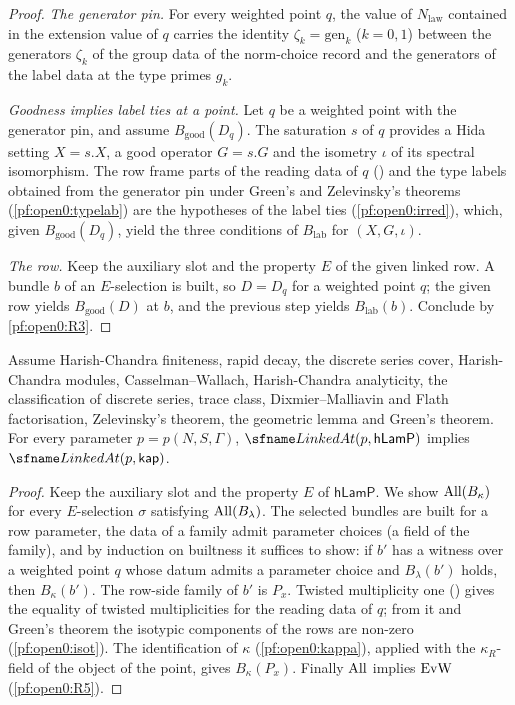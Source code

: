 \begin{proof}
\emph{The generator pin.} For every weighted point $q$, the value of $N_{\mathrm{law}}$ contained in the extension value of
$q$ carries the identity $\zeta_k=\mathrm{gen}_k$ ($k=0,1$) between the generators $\zeta_k$ of the group data of the
norm-choice record and the generators of the label data at the type primes $g_k$.

\emph{Goodness implies label ties at a point.} Let $q$ be a weighted point with the generator pin, and assume
$B_{\mathrm{good}}(D_q)$. The saturation $s$ of $q$ provides a Hida setting $X=s.X$, a good operator $G=s.G$ and the isometry
$\iota$ of its spectral isomorphism. The row frame parts of the reading data of $q$
() and the type labels obtained from the generator pin under Green's and
Zelevinsky's theorems (\cref{pf:open0:typelab}) are the hypotheses of the label ties (\cref{pf:open0:irred}), which, given
$B_{\mathrm{good}}(D_q)$, yield the three conditions of $B_{\mathrm{lab}}$ for $(X,G,\iota)$.

\emph{The row.} Keep the auxiliary slot and the property $E$ of the given linked row. A bundle $b$ of an $E$-selection is
built, so $D=D_q$ for a weighted point $q$; the given row yields $B_{\mathrm{good}}(D)$ at $b$, and the previous step
yields $B_{\mathrm{lab}}(b)$. Conclude by \ref{pf:open0:R3}.
\end{proof}

\begin{proposition}\label{pf:open0:kap}
Assume Harish-Chandra finiteness, rapid decay, the discrete series cover, Harish-Chandra modules, Casselman--Wallach,
Harish-Chandra analyticity, the classification of discrete series, trace class, Dixmier--Malliavin and Flath
factorisation, Zelevinsky's theorem, the geometric lemma and Green's theorem. For every parameter $p=p(N,S,\Gamma)$,
$\openzeroLinked(p,\mathsf{hLamP})$ implies $\openzeroLinked(p,\mathsf{kap})$.
\
\end{proposition}

\begin{proof}
Keep the auxiliary slot and the property $E$ of $\mathsf{hLamP}$. We show $\mathrm{All}(B_\kappa)$ for every $E$-selection
$\sigma$ satisfying $\mathrm{All}(B_\lambda)$. The selected bundles are built for a row parameter, the data of a family
admit parameter choices (a field of the family), and by induction on builtness it suffices to show: if $b'$ has a witness
over a weighted point $q$ whose datum admits a parameter choice and $B_\lambda(b')$ holds, then $B_\kappa(b')$. The
row-side family of $b'$ is $P_x$. Twisted multiplicity one (\lref{GlobalTheory.T.twisted_multiplicity_one}) gives the
equality of twisted multiplicities for the reading data of $q$; from it and Green's theorem the isotypic components of
the rows are non-zero (\cref{pf:open0:isot}). The identification of $\kappa$ (\cref{pf:open0:kappa}), applied with the
$\kappa_R$-field of the object of the point, gives $B_\kappa(P_x)$. Finally $\mathrm{All}$ implies $\mathrm{EvW}$
(\ref{pf:open0:R5}).
\end{proof}

